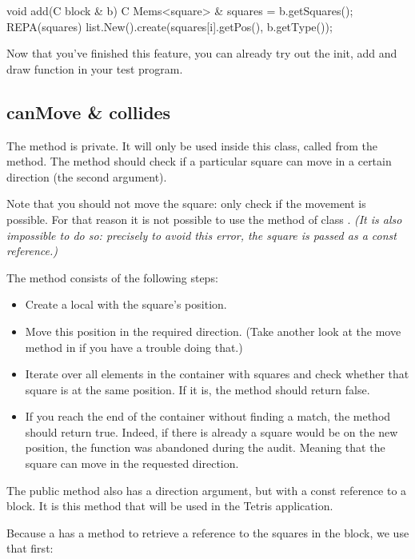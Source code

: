 \begin{code}
void add(C block & b)
{
	 C Mems<square> & squares = b.getSquares();
	 REPA(squares)
 {
	 	  list.New().create(squares[i].getPos(), b.getType());
 }
}
\end{code}

Now that you've finished this feature, you can already try out the init, add and draw function in your test program.

\subsection{canMove \& collides}
The method  is private. It will only be used inside this class, called from the  method. The method should check if a particular square can move in a certain direction (the second argument). 

Note that you should not move the square: only check if the movement is possible. For that reason it is not possible to use the  method of class . \textsl{(It is also impossible to do so: precisely to avoid this error, the square is passed as a const reference.)}

The method consists of the following steps:

\begin{itemize}
  \item Create a local  with the square's position.
	\item Move this position in the required direction. (Take another look at the move method in  if you have a trouble doing that.)
	\item Iterate over all elements in the container with squares and check whether that square is at the same position. If it is, the method should return false.
	\item If you reach the end of the container without finding a match, the method should return true. Indeed, if there is already a square would be on the new position, the function was abandoned during the audit. Meaning that the square can move in the requested direction.
\end{itemize}

The public method  also has a direction argument, but with a const reference to a block. It is this method that will be used in the Tetris application.

Because a  has a method to retrieve a reference to the squares in the block, we use that first:

